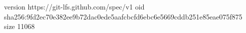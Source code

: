 version https://git-lfs.github.com/spec/v1
oid sha256:9fd2ec70e382ee9b72dac0ede5aafcbcfd6ebc6e5669cddb251e85eae075f875
size 11068
